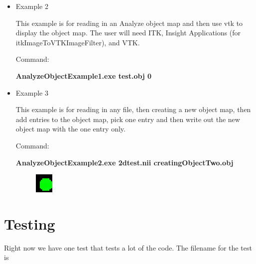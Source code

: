 \documentclass{InsightArticle}
\begin{document}
\begin{itemize}
\item Example 2


This example is for reading in an Analyze object map and
then use vtk to display the object map.  The user will need ITK,
Insight Applications (for itkImageToVTKImageFilter), and VTK.

Command:

\textbf{AnalyzeObjectExample1.exe test.obj 0}

\item Example 3

This example is for reading in any file, then creating a new object map, then add entries to the object map, pick one entry and then write out the new object map with the one entry only.

Command:

\textbf{AnalyzeObjectExample2.exe 2dtest.nii creatingObjectTwo.obj}

\begin{figure}[h]
\center
\includegraphics[width=.25\textwidth]{creatingObjectTwo.eps}
\label{fig:StreamingConceptDiagram}
\end{figure}
\end{itemize}

\section{Testing}

Right now we have one test that tests a lot of the code.  The filename for the test is 



%
%



\end{document}
